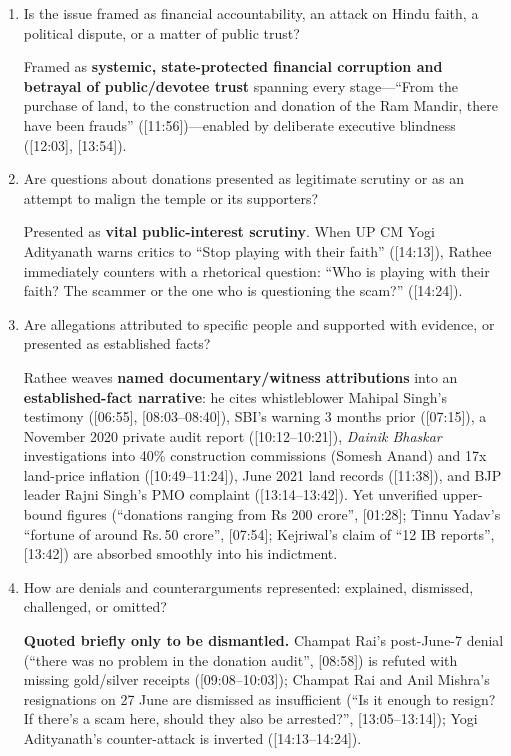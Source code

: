 \documentclass[10pt,a4paper]{article}
\begin{document}
\begin{enumerate}[leftmargin=1.5em, itemsep=6pt, topsep=4pt]
  \textbf{People Making Allegations:} Whistleblower account-in-charge Mahipal Singh ([06:55], [08:03--08:31]), SP chief Akhilesh Yadav ([08:50]), Shiv Sena's Sanjay Raut ([09:18]), Mumbai businessman Anil Vishwakarma ([09:27]), BJP politician Rajni Singh ([13:14--13:24]), and AAP's Arvind Kejriwal ([13:42]) are all treated as credible corroborating witnesses.
  \item Is the issue framed as financial accountability, an attack on Hindu faith, a political dispute, or a matter of public trust?\par\smallskip
  Framed as \textbf{systemic, state-protected financial corruption and betrayal of public/devotee trust} spanning every stage---``From the purchase of land, to the construction and donation of the Ram Mandir, there have been frauds'' ([11:56])---enabled by deliberate executive blindness ([12:03], [13:54]).
  \item Are questions about donations presented as legitimate scrutiny or as an attempt to malign the temple or its supporters?\par\smallskip
  Presented as \textbf{vital public-interest scrutiny}. When UP CM Yogi Adityanath warns critics to ``Stop playing with their faith'' ([14:13]), Rathee immediately counters with a rhetorical question: ``Who is playing with their faith? The scammer or the one who is questioning the scam?'' ([14:24]).
  \item Are allegations attributed to specific people and supported with evidence, or presented as established facts?\par\smallskip
  Rathee weaves \textbf{named documentary/witness attributions} into an \textbf{established-fact narrative}: he cites whistleblower Mahipal Singh's testimony ([06:55], [08:03--08:40]), SBI's warning 3 months prior ([07:15]), a November 2020 private audit report ([10:12--10:21]), \emph{Dainik Bhaskar} investigations into 40\% construction commissions (Somesh Anand) and 17x land-price inflation ([10:49--11:24]), June 2021 land records ([11:38]), and BJP leader Rajni Singh's PMO complaint ([13:14--13:42]). Yet unverified upper-bound figures (``donations ranging from Rs 200 crore'', [01:28]; Tinnu Yadav's ``fortune of around Rs.\,50 crore'', [07:54]; Kejriwal's claim of ``12 IB reports'', [13:42]) are absorbed smoothly into his indictment.
  \item How are denials and counterarguments represented: explained, dismissed, challenged, or omitted?\par\smallskip
  \textbf{Quoted briefly only to be dismantled.} Champat Rai's post-June-7 denial (``there was no problem in the donation audit'', [08:58]) is refuted with missing gold/silver receipts ([09:08--10:03]); Champat Rai and Anil Mishra's resignations on 27 June are dismissed as insufficient (``Is it enough to resign? If there's a scam here, should they also be arrested?'', [13:05--13:14]); Yogi Adityanath's counter-attack is inverted ([14:13--14:24]).

\end{enumerate}
\end{document}
